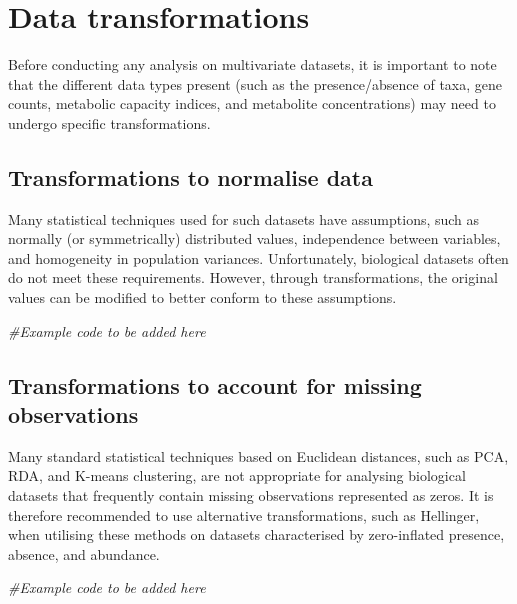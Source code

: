 \documentclass[
]{book}
\newenvironment{Shaded}{\begin{snugshade}}{\end{snugshade}}
\newcommand{\CommentTok}[1]{\textcolor[rgb]{0.56,0.35,0.01}{\textit{#1}}}
\begin{document}
\hypertarget{data-transformations}{%
\chapter{Data transformations}\label{data-transformations}}

Before conducting any analysis on multivariate datasets, it is important to note that the different data types present (such as the presence/absence of taxa, gene counts, metabolic capacity indices, and metabolite concentrations) may need to undergo specific transformations.

\hypertarget{transformations-to-normalise-data}{%
\section{Transformations to normalise data}\label{transformations-to-normalise-data}}

Many statistical techniques used for such datasets have assumptions, such as normally (or symmetrically) distributed values, independence between variables, and homogeneity in population variances. Unfortunately, biological datasets often do not meet these requirements. However, through transformations, the original values can be modified to better conform to these assumptions.

\begin{Shaded}
\begin{Highlighting}[]
\CommentTok{\#Example code to be added here}
\end{Highlighting}
\end{Shaded}

\hypertarget{transformations-to-account-for-missing-observations}{%
\section{Transformations to account for missing observations}\label{transformations-to-account-for-missing-observations}}

Many standard statistical techniques based on Euclidean distances, such as PCA, RDA, and K-means clustering, are not appropriate for analysing biological datasets that frequently contain missing observations represented as zeros. It is therefore recommended to use alternative transformations, such as Hellinger, when utilising these methods on datasets characterised by zero-inflated presence, absence, and abundance.

\begin{Shaded}
\begin{Highlighting}[]
\CommentTok{\#Example code to be added here}
\end{Highlighting}
\end{Shaded}
\end{document}
